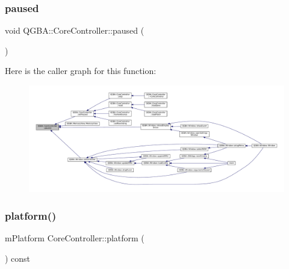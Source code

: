 \mbox{\label{class_q_g_b_a_1_1_core_controller_a0a5e5e4aa4dad2654a5e16ac46cd75d3}} 
\subsubsection{\texorpdfstring{paused}{paused}}
{\footnotesize\ttfamily void Q\+G\+B\+A\+::\+Core\+Controller\+::paused (\begin{DoxyParamCaption}{ }\end{DoxyParamCaption})\hspace{0.3cm}{\ttfamily [signal]}}

Here is the caller graph for this function\+:
\nopagebreak
\begin{figure}[H]
\begin{center}
\leavevmode
\includegraphics[width=350pt]{class_q_g_b_a_1_1_core_controller_a0a5e5e4aa4dad2654a5e16ac46cd75d3_icgraph}
\end{center}
\end{figure}
\mbox{\label{class_q_g_b_a_1_1_core_controller_a340f633528b35be81f7803c78dfd63d4}} 
\subsubsection{\texorpdfstring{platform()}{platform()}}
{\footnotesize\ttfamily m\+Platform Core\+Controller\+::platform (\begin{DoxyParamCaption}{ }\end{DoxyParamCaption}) const}

